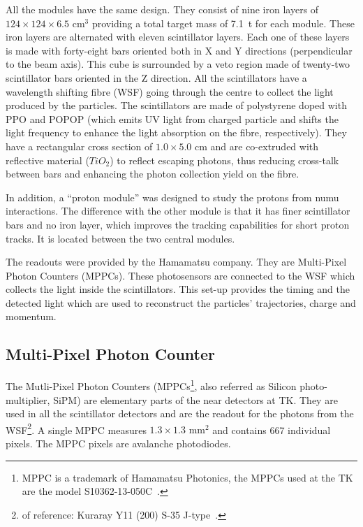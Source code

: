 All the modules have the same design. They consist of nine iron layers
of $124 \times 124 \times 6.5\text{~cm}^{3}$ providing a total target
mass of 7.1~t for each module. These iron layers are alternated with
eleven scintillator layers.  Each one of these layers is made with
forty-eight bars oriented both in X and Y directions (perpendicular to
the beam axis). This cube is surrounded by a veto region made of
twenty-two scintillator bars oriented in the Z direction. All the
scintillators have a wavelength shifting fibre (\Gls{WSF}) going
through the centre to collect the light produced by the particles. The
scintillators are made of polystyrene doped with \Gls{PPO} and
\Gls{POPOP} (which emits UV light from charged particle and shifts the
light frequency to enhance the light absorption on the fibre,
respectively). They have a rectangular cross section of
$1.0 \times 5.0\text{~cm}$ and are co-extruded with reflective
material ($TiO_2$) to reflect escaping photons, thus reducing
cross-talk between bars and enhancing the photon collection yield on
the fibre.

In addition, a ``proton module'' was designed to study the protons
from \gls{numu} interactions. The difference with the other module is
that it has finer scintillator bars and no iron layer, which improves
the tracking capabilities for short proton tracks. It is located
between the two central modules.

The readouts were provided by the Hamamatsu company. They are
Multi-Pixel Photon Counters (\Glspl{MPPC}). These photosensors are
connected to the \Gls{WSF} which collects the light inside the
scintillators. This set-up provides the timing and the detected light
which are used to reconstruct the particles' trajectories, charge and
momentum.

\subsection{Multi-Pixel Photon Counter}
\label{subsec:mppc}
The Mutli-Pixel Photon Counters (\Glspl{MPPC}\footnote{\Gls{MPPC} is a
  trademark of Hamamatsu Photonics, the \Glspl{MPPC} used at the
  \Gls{TK} are the model S10362-13-050C~\cite{MPPC}.}, also referred
as Silicon photo-multiplier, \Gls{SiPM}) are elementary parts of the
near detectors at \Gls{TK}. They are used in all the scintillator
detectors and are the readout for the photons from the
\Gls{WSF}\footnote{of reference: Kuraray Y11 (200) S-35
  J-type~\cite{T2K2011}.}. A single \Gls{MPPC} measures
$1.3\times 1.3 \text{~mm}^2$ and contains 667 individual pixels. The
\Gls{MPPC} pixels are avalanche photodiodes.


